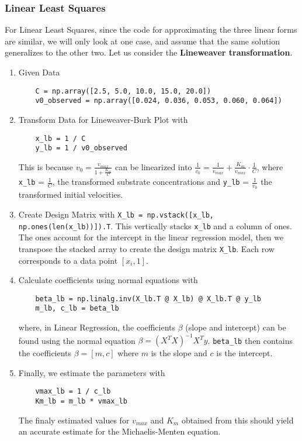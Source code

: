 \documentclass{article} %
\theoremstyle{definition}
\theoremstyle{remark}
\theoremstyle{plain}
\begin{document}
\subsubsection{Linear Least Squares}
For Linear Least Squares, since the code for approximating the three linear forms are similar, we will only look at one case, and assume that the same solution generalizes to the other two. Let us consider the \textbf{Lineweaver transformation}.

\begin{enumerate}
    \item Given Data
    \begin{verbatim}
    C = np.array([2.5, 5.0, 10.0, 15.0, 20.0])
    v0_observed = np.array([0.024, 0.036, 0.053, 0.060, 0.064])
    \end{verbatim}
    \item Transform Data for Lineweaver-Burk Plot with
    \begin{verbatim}
    x_lb = 1 / C
    y_lb = 1 / v0_observed
    \end{verbatim}
    This is because $v_0 = \frac{v_{max}}{1 + \frac{K_m}{C}}$ can be linearized into $\frac{1}{v_0} = \frac{1}{v_{max}} + \frac{K_m}{v_{max}} \cdot \frac{1}{C}$, where \verb|x_lb| = $\frac{1}{C}$, the transformed substrate concentrations and \verb|y_lb| = $\frac{1}{v_0}$ the transformed initial velocities.
    \item Create Design Matrix with \verb|X_lb = np.vstack([x_lb, np.ones(len(x_lb))]).T|. This  vertically stacks \verb|x_lb| and a column of ones. The ones account for the intercept in the linear regression model, then we transpose the stacked array to create the design matrix \verb|X_lb|. Each row corresponds to a data point $[x_i, 1]$.
    \item Calculate coefficients using normal equations with 
    \begin{verbatim}
    beta_lb = np.linalg.inv(X_lb.T @ X_lb) @ X_lb.T @ y_lb
    m_lb, c_lb = beta_lb
    \end{verbatim}
    where, in Linear Regression, the coefficients $\beta$ (slope and intercept) can be found using the normal equation $\beta = (X^TX)^{-1} X^T y$. \verb|beta_lb| then contains the coefficients $\beta = [m,c]$ where $m$ is the slope and $c$ is the intercept.
    \item Finally, we estimate the parameters with
    \begin{verbatim}
    vmax_lb = 1 / c_lb
    Km_lb = m_lb * vmax_lb
    \end{verbatim}
    The finaly estimated values for $v_{max}$ and $K_m$ obtained from this should yield an accurate estimate for the Michaelis-Menten equation.
    
    
\end{enumerate}
\end{document}
